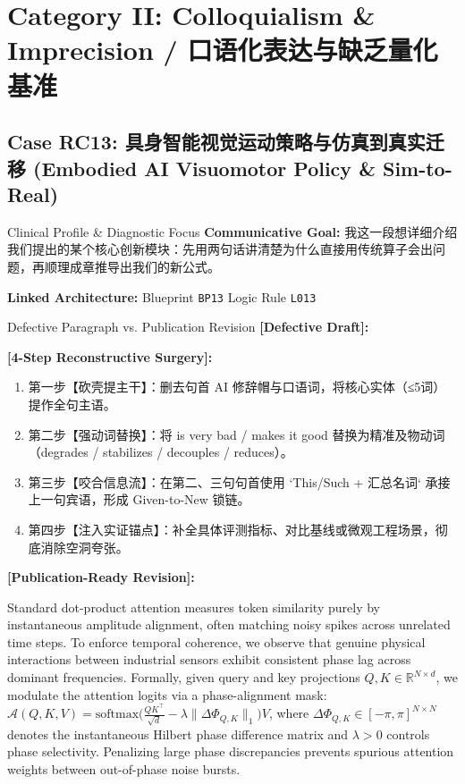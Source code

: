 \section{Category II: Colloquialism \& Imprecision / 口语化表达与缺乏量化基准}
\subsection{Case RC13: 具身智能视觉运动策略与仿真到真实迁移 (Embodied AI Visuomotor Policy \& Sim-to-Real)}\label{case:RC13}
\begin{ConceptBox}{Clinical Profile \& Diagnostic Focus}
\textbf{Communicative Goal:} 我这一段想详细介绍我们提出的某个核心创新模块：先用两句话讲清楚为什么直接用传统算子会出问题，再顺理成章推导出我们的新公式。\par
\textbf{Linked Architecture:} Blueprint \texttt{BP13} \enspace\textbar\enspace Logic Rule \texttt{L013}
\end{ConceptBox}
\begin{ExampleBox}{Defective Paragraph vs. Publication Revision}
\textbf{\color{TargetHighlight}[Defective Draft]:}\par
{}\par\vspace{6pt}
\textbf{\color{AcadForest}[4-Step Reconstructive Surgery]:}
\begin{enumerate}[label=\textbf{\color{AcadNavy}Step \arabic*:}, leftmargin=2em]
  \item 第一步【砍壳提主干】：删去句首 AI 修辞帽与口语词，将核心实体（≤5词）提作全句主语。
  \item 第二步【强动词替换】：将 is very bad / makes it good 替换为精准及物动词（degrades / stabilizes / decouples / reduces）。
  \item 第三步【咬合信息流】：在第二、三句句首使用 `This/Such + 汇总名词` 承接上一句宾语，形成 Given-to-New 锁链。
  \item 第四步【注入实证锚点】：补全具体评测指标、对比基线或微观工程场景，彻底消除空洞夸张。
\end{enumerate}\vspace{4pt}
\textbf{\color{AcadNavy}[Publication-Ready Revision]:}\par
Standard dot-product attention measures token similarity purely by instantaneous amplitude alignment, often matching noisy spikes across unrelated time steps. To enforce temporal coherence, we observe that genuine physical interactions between industrial sensors exhibit consistent phase lag across dominant frequencies. Formally, given query and key projections $Q, K \in \mathbb{R}^{N \times d}$, we modulate the attention logits via a phase-alignment mask: $\mathcal{A}(Q, K, V) = \text{softmax}\big(\frac{QK^\top}{\sqrt{d}} - \lambda \|\Delta \Phi_{Q,K}\|_1\big)V$, where $\Delta \Phi_{Q,K} \in [-\pi, \pi]^{N \times N}$ denotes the instantaneous Hilbert phase difference matrix and $\lambda > 0$ controls phase selectivity. Penalizing large phase discrepancies prevents spurious attention weights between out-of-phase noise bursts.
\end{ExampleBox}
